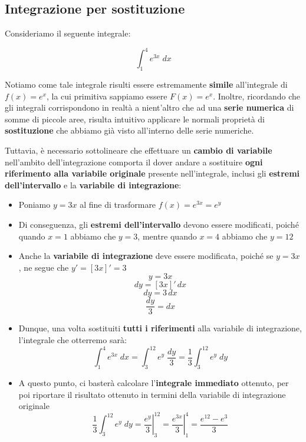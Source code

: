 \documentclass[a4paper, 12pt]{report}
\begin{document}
    \quad
    
    
    \subsection{Integrazione per sostituzione}
    
    Consideriamo il seguente integrale:
    
    \[ \int_{1}^{4} e^{3x} \; dx\]
    
    Notiamo come tale integrale risulti essere estremamente \textbf{simile} all'integrale di $f(x) = e^x$, la cui primitiva sappiamo essere $F(x) = e^x$. Inoltre, ricordando che gli integrali corrispondono in realtà a nient'altro che ad una \textbf{serie numerica} di somme di piccole aree, risulta intuitivo applicare le normali proprietà di \textbf{sostituzione} che abbiamo già visto all'interno delle serie numeriche.
    
    Tuttavia, è necessario sottolineare che effettuare un \textbf{cambio di variabile} nell'ambito dell'integrazione comporta il dover andare a sostituire \textbf{ogni riferimento alla variabile originale} presente nell'integrale, inclusi gli \textbf{estremi dell'intervallo} e la \textbf{variabile di integrazione}:
    
    
    \begin{itemize}
        \item Poniamo $y = 3x$ al fine di trasformare $f(x) = e^{3x} = e^y$
        \item Di conseguenza, gli \textbf{estremi dell'intervallo} devono essere modificati, poiché quando $x = 1$ abbiamo che $y = 3$, mentre quando $x=4$ abbiamo che $y = 12$
        \item Anche la \textbf{variabile di integrazione} deve essere modificata, poiché se $y = 3x$, ne segue che $y' = [3x]' = 3$
        \[ y = 3x\]
        \[ dy = [3x]' \,dx\]
        \[ dy = 3 \,dx \]
        \[ \frac{dy}{3} = dx \]
        \item Dunque, una volta sostituiti \textbf{tutti i riferimenti} alla variabile di integrazione, l'integrale che otterremo sarà:
        \[ \int_{1}^{4} e^{3x} \; dx = \int_{3}^{12} e^y \; \frac{dy}{3} = \frac{1}{3} \int_{3}^{12} e^y \; dy \]
        \item A questo punto, ci basterà calcolare l'\textbf{integrale immediato} ottenuto, per poi riportare il risultato ottenuto in termini della variabile di integrazione originale
        \[ \frac{1}{3} \int_{3}^{12} e^y \; dy = \left . \frac{e^y}{3} \right |_{3}^{12} = \left . \frac{e^{3x}}{3} \right |_{1}^{4} = \frac{e^{12}-e^3}{3}\]
    \end{itemize}
    
\end{document}
